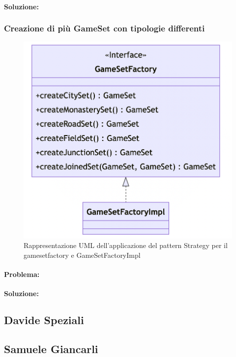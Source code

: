 \paragraph{Soluzione:} 

\subsubsection*{Creazione di più GameSet con tipologie differenti}
\begin{figure}[hh]
    \centering\includegraphics[scale=.3]{images/gamesetfactory.png}
    \caption{Rappresentazione UML dell'applicazione del pattern Strategy per il gamesetfactory e GameSetFactoryImpl}
\end{figure}

\paragraph{Problema:}

\paragraph{Soluzione:}

\subsection*{Davide Speziali}

\subsection*{Samuele Giancarli}
